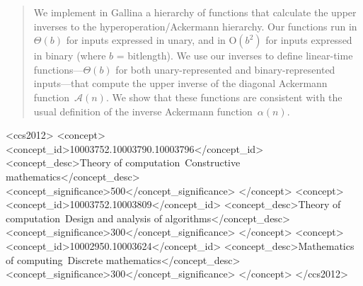 \documentclass[sigplan,screen]{acmart}
\newcommand{\bigO}{\text{O}}
\newcommand{\Ack}{\ensuremath{\mathcal{A}}}
\begin{document}
\begin{abstract}
	We implement in Gallina a hierarchy of functions that calculate
	the upper inverses to the hyperoperation/Ackermann hierarchy.
	Our functions run in $\Theta(b)$ for inputs expressed
	in unary, and in $\bigO(b^2)$ for inputs expressed in binary \linebreak (where $b$ = bitlength).
	We use our inverses to define linear-time functions---$\Theta(b)$ for both unary-represented 
	and binary-\linebreak represented inputs---that compute the upper inverse of the 
	diagonal Ackermann %
	function~$\Ack(n)$. We show that these functions are consistent with the usual definition of the \linebreak inverse Ackermann function~$\alpha(n)$.
\end{abstract}


\begin{CCSXML}
<ccs2012>
<concept>
<concept_id>10003752.10003790.10003796</concept_id>
<concept_desc>Theory of computation~Constructive mathematics</concept_desc>
<concept_significance>500</concept_significance>
</concept>
<concept>
<concept_id>10003752.10003809</concept_id>
<concept_desc>Theory of computation~Design and analysis of algorithms</concept_desc>
<concept_significance>300</concept_significance>
</concept>
<concept>
<concept_id>10002950.10003624</concept_id>
<concept_desc>Mathematics of computing~Discrete mathematics</concept_desc>
<concept_significance>300</concept_significance>
</concept>
</ccs2012>
\end{CCSXML}



\end{document}
